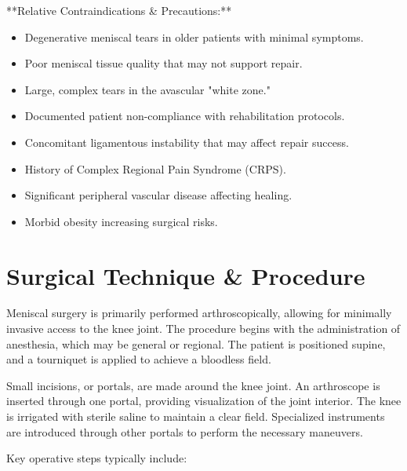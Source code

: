 **Relative Contraindications \& Precautions:**
\begin{itemize}
  \item Degenerative meniscal tears in older patients with minimal symptoms.
  \item Poor meniscal tissue quality that may not support repair.
  \item Large, complex tears in the avascular "white zone."
  \item Documented patient non-compliance with rehabilitation protocols.
  \item Concomitant ligamentous instability that may affect repair success.
  \item History of Complex Regional Pain Syndrome (CRPS).
  \item Significant peripheral vascular disease affecting healing.
  \item Morbid obesity increasing surgical risks.
\end{itemize}

\section*{Surgical Technique \& Procedure}
Meniscal surgery is primarily performed arthroscopically, allowing for minimally invasive access to the knee joint. The procedure begins with the administration of anesthesia, which may be general or regional. The patient is positioned supine, and a tourniquet is applied to achieve a bloodless field.

Small incisions, or portals, are made around the knee joint. An arthroscope is inserted through one portal, providing visualization of the joint interior. The knee is irrigated with sterile saline to maintain a clear field. Specialized instruments are introduced through other portals to perform the necessary maneuvers.

Key operative steps typically include:

